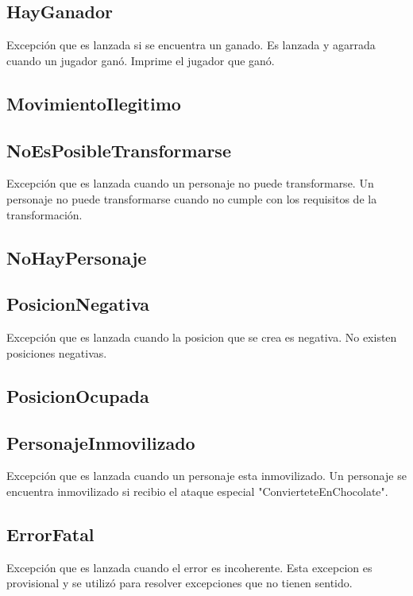 \documentclass[a4paper]{article}
\begin{document}
\subsection{HayGanador}
Excepción que es lanzada si se encuentra un ganado. Es lanzada y agarrada cuando un jugador ganó. Imprime el jugador que ganó.

\subsection{MovimientoIlegitimo}

\subsection{NoEsPosibleTransformarse}
Excepción que es lanzada cuando un personaje no puede transformarse. Un personaje no puede transformarse cuando no cumple con los requisitos de la transformación.

\subsection{NoHayPersonaje}

\subsection{PosicionNegativa}
Excepción que es lanzada cuando la posicion que se crea es negativa. No existen posiciones negativas.


\subsection{PosicionOcupada}

\subsection{PersonajeInmovilizado}
Excepción que es lanzada cuando un personaje esta inmovilizado. Un personaje se encuentra inmovilizado si recibio el ataque especial "ConvierteteEnChocolate".

\subsection{ErrorFatal}
Excepción que es lanzada cuando el error es incoherente. Esta excepcion es provisional y se utilizó para resolver excepciones que no tienen sentido. 



\newpage
\end{document}
